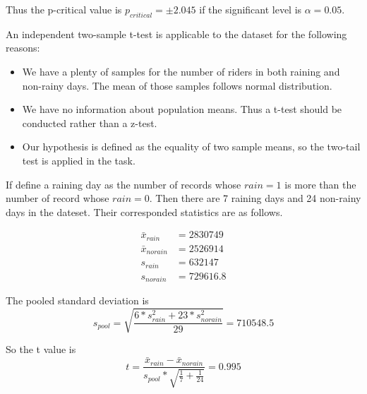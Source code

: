 \documentclass[paper=a4, fontsize=11pt]{scrartcl} %
\numberwithin{equation}{section} %
\numberwithin{figure}{section} %
\numberwithin{table}{section} %
\begin{document}
Thus the p-critical value is $p_{critical} = \pm 2.045$ if the significant level is
$\alpha = 0.05$.

\medskip
\noindent{}
\medskip

An independent two-sample t-test is applicable to the dataset for the following reasons:
\begin{itemize}
	\item We have a plenty of samples for the number of riders in both raining and
	non-rainy days. The mean of those samples follows normal distribution.
	\item We have no information about population means. Thus a t-test should be
	conducted rather than a z-test.
	\item Our hypothesis is defined as the equality of two sample means, so the
	two-tail test is applied in the task.
\end{itemize}

\medskip
\noindent{}
\medskip

If define a raining day as the number of records whose $rain = 1$ is more than
the number of record whose $rain = 0$. Then there are 7 raining days and 24
non-rainy days in the dateset. Their corresponded statistics are as follows.

\begin{align}
	\bar{x}_{rain} &= 2830749 \nonumber \\
	\bar{x}_{norain} &= 2526914 \nonumber \\
	s_{rain} &= 632147 \nonumber \\
	s_{norain} &= 729616.8 \nonumber
\end{align}

The pooled standard deviation is
\begin{equation}
	s_{pool} = \sqrt{\frac{6*s_{rain}^2+23*s_{norain}^2}{29}} = 710548.5
\end{equation}

So the t value is
\begin{equation}
	t = \frac{\bar{x}_{rain} - \bar{x}_{norain}}{s_{pool} * \sqrt{\frac{1}{7}+\frac{1}{24}}}
	  = 0.995
\end{equation}
\end{document}
